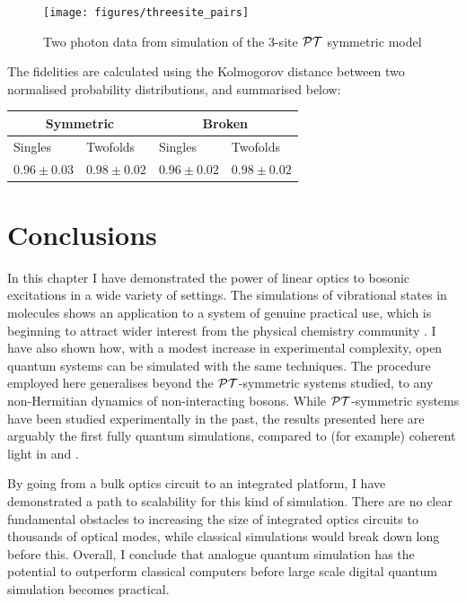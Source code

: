 \begin{figure}[p]
  \centering
  \texttt{[image: figures/threesite\_pairs]}
  \caption[Two photon data from simulation of the 3-site PT symmetric model]
  {Two photon data from simulation of the 3-site \(\mathcal{PT}\) symmetric model}
  \label{fig:threesitetwofolds}
\end{figure}

The fidelities are calculated using the Kolmogorov distance between two
normalised probability distributions, and summarised below:

\begin{tabular}{|l|l|l|l|}
  \hline
  \multicolumn{2}{|c|}{Symmetric} & \multicolumn{2}{|c|}{Broken} \\
  \hline
  Singles & Twofolds & Singles & Twofolds \\
  \hline
  \(0.96 \pm 0.03\) & \(0.98 \pm 0.02\) & \(0.96 \pm 0.02\) &
  \(0.98 \pm 0.02\) \\
  \hline
\end{tabular}

\section{Conclusions}
In this chapter I have demonstrated the power of linear optics to bosonic
excitations in a wide variety of settings. The simulations of vibrational states
in molecules shows an application to a system of genuine practical use,
which is beginning to attract wider interest from the physical chemistry
community \cite{vibronics}. I have also shown how, with a modest increase in
experimental complexity, open quantum systems can be simulated with the same
techniques. The procedure employed here generalises beyond the \(\mathcal{PT}\)-symmetric
systems studied, to any non-Hermitian dynamics of non-interacting bosons. While
\(\mathcal{PT}\)-symmetric systems have been studied experimentally in the past, the
results presented here are arguably the first fully quantum simulations,
compared to (for example) coherent light in \cite{pt-ruter} and
\cite{pt-regensburger}.

By going from a bulk optics circuit to an integrated platform, I have
demonstrated a path to scalability for this kind of simulation. There are no
clear fundamental obstacles to increasing the size of integrated optics circuits
to thousands of optical modes, while classical simulations would break down long
before this. Overall, I conclude that analogue quantum simulation has the
potential to outperform classical computers before large scale digital quantum
simulation becomes practical.

